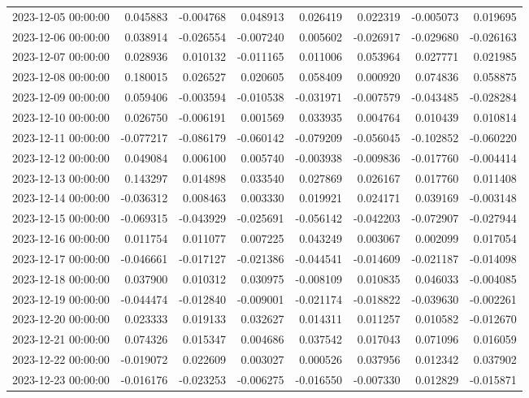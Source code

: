 \begin{tabular}{lrrrrrrr}
2023-12-05 00:00:00 & 0.045883 & -0.004768 & 0.048913 & 0.026419 & 0.022319 & -0.005073 & 0.019695 \\
2023-12-06 00:00:00 & 0.038914 & -0.026554 & -0.007240 & 0.005602 & -0.026917 & -0.029680 & -0.026163 \\
2023-12-07 00:00:00 & 0.028936 & 0.010132 & -0.011165 & 0.011006 & 0.053964 & 0.027771 & 0.021985 \\
2023-12-08 00:00:00 & 0.180015 & 0.026527 & 0.020605 & 0.058409 & 0.000920 & 0.074836 & 0.058875 \\
2023-12-09 00:00:00 & 0.059406 & -0.003594 & -0.010538 & -0.031971 & -0.007579 & -0.043485 & -0.028284 \\
2023-12-10 00:00:00 & 0.026750 & -0.006191 & 0.001569 & 0.033935 & 0.004764 & 0.010439 & 0.010814 \\
2023-12-11 00:00:00 & -0.077217 & -0.086179 & -0.060142 & -0.079209 & -0.056045 & -0.102852 & -0.060220 \\
2023-12-12 00:00:00 & 0.049084 & 0.006100 & 0.005740 & -0.003938 & -0.009836 & -0.017760 & -0.004414 \\
2023-12-13 00:00:00 & 0.143297 & 0.014898 & 0.033540 & 0.027869 & 0.026167 & 0.017760 & 0.011408 \\
2023-12-14 00:00:00 & -0.036312 & 0.008463 & 0.003330 & 0.019921 & 0.024171 & 0.039169 & -0.003148 \\
2023-12-15 00:00:00 & -0.069315 & -0.043929 & -0.025691 & -0.056142 & -0.042203 & -0.072907 & -0.027944 \\
2023-12-16 00:00:00 & 0.011754 & 0.011077 & 0.007225 & 0.043249 & 0.003067 & 0.002099 & 0.017054 \\
2023-12-17 00:00:00 & -0.046661 & -0.017127 & -0.021386 & -0.044541 & -0.014609 & -0.021187 & -0.014098 \\
2023-12-18 00:00:00 & 0.037900 & 0.010312 & 0.030975 & -0.008109 & 0.010835 & 0.046033 & -0.004085 \\
2023-12-19 00:00:00 & -0.044474 & -0.012840 & -0.009001 & -0.021174 & -0.018822 & -0.039630 & -0.002261 \\
2023-12-20 00:00:00 & 0.023333 & 0.019133 & 0.032627 & 0.014311 & 0.011257 & 0.010582 & -0.012670 \\
2023-12-21 00:00:00 & 0.074326 & 0.015347 & 0.004686 & 0.037542 & 0.017043 & 0.071096 & 0.016059 \\
2023-12-22 00:00:00 & -0.019072 & 0.022609 & 0.003027 & 0.000526 & 0.037956 & 0.012342 & 0.037902 \\
2023-12-23 00:00:00 & -0.016176 & -0.023253 & -0.006275 & -0.016550 & -0.007330 & 0.012829 & -0.015871 \\

\end{tabular}
